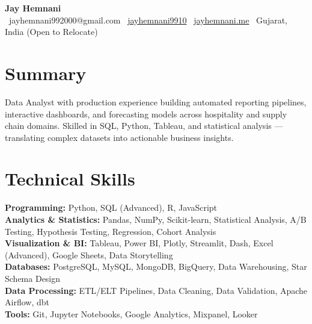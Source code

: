 \documentclass[letterpaper,10pt]{article}
\begin{document}
\begin{center}
    {\Huge \bfseries\color{accent} Jay Hemnani} \\ \vspace{2pt}
    \small
    \faEnvelope\ jayhemnani992000@gmail.com \quad
    \faGithub\ \href{https://github.com/jayhemnani9910}{jayhemnani9910} \quad
    \faGlobe\ \href{https://jayhemnani.me}{jayhemnani.me} \quad
    \faMapMarker*\ Gujarat, India (Open to Relocate)
\end{center}
\vspace{-6pt}

\section{Summary}
\small{Data Analyst with production experience building automated reporting pipelines, interactive dashboards, and forecasting models across hospitality and supply chain domains. Skilled in SQL, Python, Tableau, and statistical analysis --- translating complex datasets into actionable business insights.}
\vspace{-4pt}

\section{Technical Skills}
 \begin{itemize}[leftmargin=0.12in, label={}]
    \small{\item{
     \textbf{Programming:} Python, SQL (Advanced), R, JavaScript \\
     \textbf{Analytics \& Statistics:} Pandas, NumPy, Scikit-learn, Statistical Analysis, A/B Testing, Hypothesis Testing, Regression, Cohort Analysis \\
     \textbf{Visualization \& BI:} Tableau, Power BI, Plotly, Streamlit, Dash, Excel (Advanced), Google Sheets, Data Storytelling \\
     \textbf{Databases:} PostgreSQL, MySQL, MongoDB, BigQuery, Data Warehousing, Star Schema Design \\
     \textbf{Data Processing:} ETL/ELT Pipelines, Data Cleaning, Data Validation, Apache Airflow, dbt \\
     \textbf{Tools:} Git, Jupyter Notebooks, Google Analytics, Mixpanel, Looker
    }}
 \end{itemize}
 \vspace{-6pt}
\end{document}
